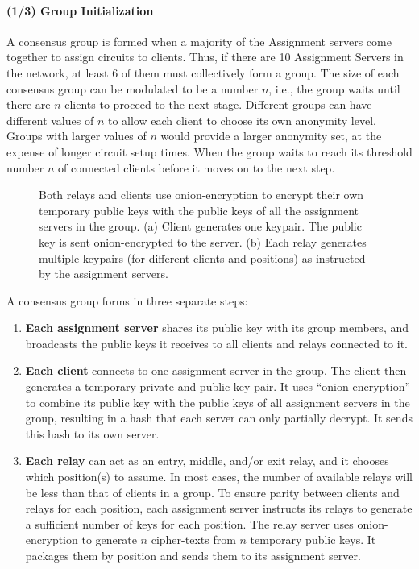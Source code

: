 \paragraph{(1/3) Group Initialization}

A consensus group is formed when a majority of the Assignment servers come
together to assign circuits to clients. Thus, if there are 10 Assignment
Servers in the network, at least 6 of them must collectively form a group. The
size of each consensus group can be modulated to be a number $n$, i.e., the
group waits until there are $n$ clients to proceed to the next stage. Different
groups can have different values of $n$ to allow each client to choose its own
anonymity level. Groups with larger values of $n$ would provide a larger
anonymity set, at the expense of longer circuit setup times. When the group
waits to reach its threshold number $n$ of connected clients before it moves
on to the next step.

\begin{figure}[htbp]
  \centering
  
  \caption{Both relays and clients use onion-encryption to encrypt their own
  temporary public keys with the public keys of all the assignment servers in the group. (a) Client generates one keypair. The public key is sent onion-encrypted to the server. (b) Each relay generates multiple keypairs (for different clients and positions) as instructed by the assignment servers.}
  \label{figure:transfer}
\end{figure}

A consensus group forms in three separate steps:

\begin{enumerate} 

\item \textbf{Each assignment server} shares its public key with its group
members, and broadcasts the public keys it receives to all clients and relays
connected to it.

\item \textbf{Each client} connects to one assignment server in the group. The
client then generates a temporary private and public key pair. It uses ``onion
encryption'' to combine its public key with the public keys of all assignment
servers in the group, resulting in a hash that each server can only partially
decrypt. It sends this hash to its own server.

\item \textbf{Each relay} can act as an entry, middle, and/or exit relay, and
it chooses which position(s) to assume. In most cases, the number of available
relays will be less than that of clients in a group. To ensure parity between
clients and relays for each position, each assignment server instructs its relays to generate a
sufficient number of keys for each position. The relay server uses
onion-encryption to generate $n$ cipher-texts from $n$ temporary public keys.
It packages them by position and sends them to its assignment server.
\end{enumerate}

